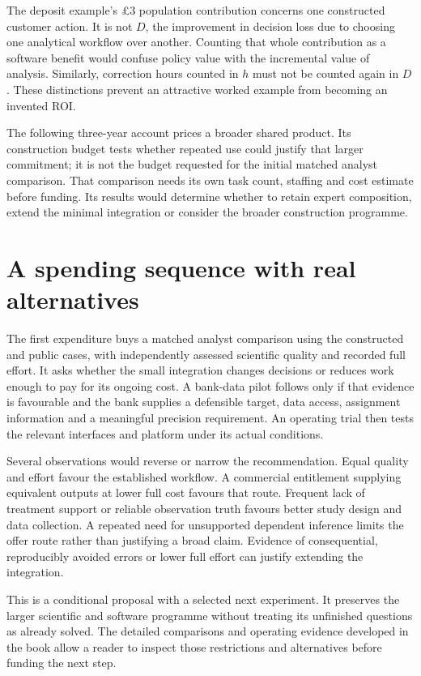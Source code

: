 The deposit example's \pounds3 population contribution concerns one
constructed customer action. It is not $D$, the improvement in decision
loss due to choosing one analytical workflow over another. Counting
that whole contribution as a software benefit would confuse policy value
with the incremental value of analysis. Similarly, correction hours
counted in $h$ must not be counted again in $D$. These distinctions
prevent an attractive worked example from becoming an invented ROI.

The following three-year account prices a broader shared product. Its
construction budget tests whether repeated use could justify that larger
commitment; it is not the budget requested for the initial matched analyst
comparison. That comparison needs its own task count, staffing and cost
estimate before funding. Its results would determine whether to retain
expert composition, extend the minimal integration or consider the broader
construction programme.




\section{A spending sequence with real alternatives}
The first expenditure buys a matched analyst comparison using the
constructed and public cases, with independently assessed scientific
quality and recorded full effort. It asks whether the small integration
changes decisions or reduces work enough to pay for its ongoing cost.
A bank-data pilot follows only if that evidence is favourable and the
bank supplies a defensible target, data access, assignment information
and a meaningful precision requirement. An operating trial then tests
the relevant interfaces and platform under its actual conditions.

Several observations would reverse or narrow the recommendation. Equal
quality and effort favour the established workflow. A commercial
entitlement supplying equivalent outputs at lower full cost favours
that route. Frequent lack of treatment support or reliable observation
truth favours better study design and data collection. A repeated
need for unsupported dependent inference limits the offer route rather
than justifying a broad claim. Evidence of consequential, reproducibly
avoided errors or lower full effort can justify extending the integration.

This is a conditional proposal with a selected next experiment. It
preserves the larger scientific and software programme without treating
its unfinished questions as already solved. The detailed comparisons
and operating evidence developed in the book allow a reader to inspect those
restrictions and alternatives before funding the next step.
